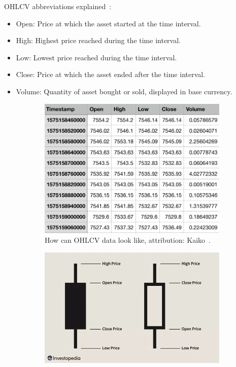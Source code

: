 OHLCV abbreviations explained~\cite{kaiko-ohlcv}:
\begin{itemize}
    \item Open: Price at which the asset started at the time interval.
    \item High: Highest price reached during the time interval.
    \item Low: Lowest price reached during the time interval.
    \item Close: Price at which the asset ended after the time interval.
    \item Volume: Quantity of asset bought or sold, displayed in base currency.
\end{itemize}

\begin{figure}
    \centering
    \begin{subfigure}[t]{0.45\textwidth}
        \centering
        \includegraphics[width=\textwidth]{figures/OHLCV-data.png}
        \caption{How can OHLCV data look like, attribution: Kaiko~\cite{kaiko-ohlcv}.}
        \label{OHLCV-figure}
    \end{subfigure}
    \hfill
    \begin{subfigure}[t]{0.45\textwidth}
        \centering
        \includegraphics[width=\textwidth]{figures/candlestick-data.png}

\end{subfigure}
\end{figure}
